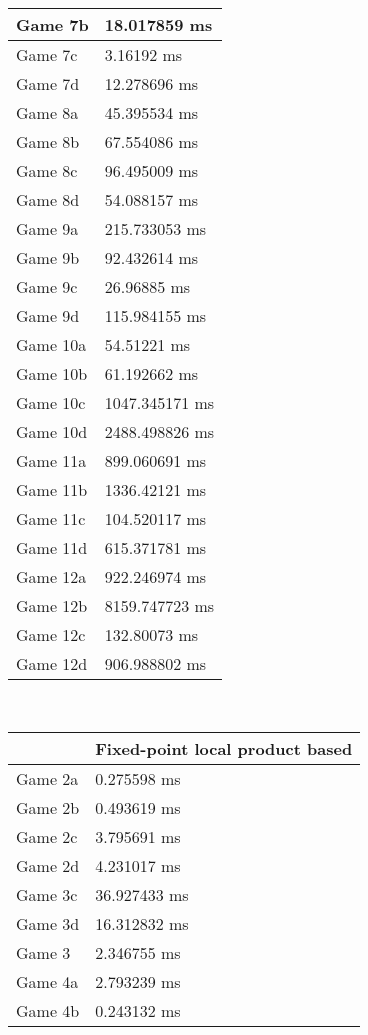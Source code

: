 \begin{multicols}{2}
\begin{tabular}{|l|l|}
	Game 7b & 18.017859 ms \\ \hline
	Game 7c & 3.16192 ms \\ \hline
	Game 7d & 12.278696 ms \\ \hline
	Game 8a & 45.395534 ms \\ \hline
	Game 8b & 67.554086 ms \\ \hline
	Game 8c & 96.495009 ms \\ \hline
	Game 8d & 54.088157 ms \\ \hline
	Game 9a & 215.733053 ms \\ \hline
	Game 9b & 92.432614 ms \\ \hline
	Game 9c & 26.96885 ms \\ \hline
	Game 9d & 115.984155 ms \\ \hline
	Game 10a & 54.51221 ms \\ \hline
	Game 10b & 61.192662 ms \\ \hline
	Game 10c & 1047.345171 ms \\ \hline
	Game 10d & 2488.498826 ms \\ \hline
	Game 11a & 899.060691 ms \\ \hline
	Game 11b & 1336.42121 ms \\ \hline
	Game 11c & 104.520117 ms \\ \hline
	Game 11d & 615.371781 ms \\ \hline
	Game 12a & 922.246974 ms \\ \hline
	Game 12b & 8159.747723 ms \\ \hline
	Game 12c & 132.80073 ms \\ \hline
	Game 12d & 906.988802 ms \\ \hline
\end{tabular}\\
\begin{tabular}{|l|l|}
	\hline
	& Fixed-point local product based \\ \hline
	Game 2a & 0.275598 ms \\ \hline
	Game 2b & 0.493619 ms \\ \hline
	Game 2c & 3.795691 ms \\ \hline
	Game 2d & 4.231017 ms \\ \hline
	Game 3c & 36.927433 ms \\ \hline
	Game 3d & 16.312832 ms \\ \hline
	Game 3 & 2.346755 ms \\ \hline
	Game 4a & 2.793239 ms \\ \hline
	Game 4b & 0.243132 ms \\ \hline

\end{tabular}
\end{multicols}
